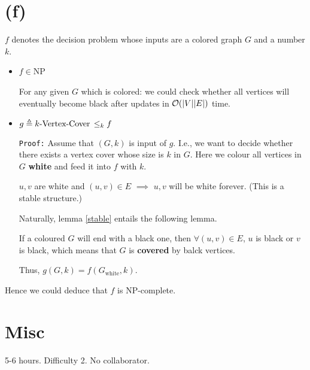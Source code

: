 \documentclass{article}
\begin{document}
\section*{(f)}
$f$ denotes the decision problem whose inputs are a colored graph $G$ and a number $k$.
\begin{itemize}
	\item $f\in$NP

		For any given $G$ which is colored: we could check whether all vertices will eventually become black after updates in  $\mathcal{O}(\qty|V|\qty|E|)$ time.

	\item $g\triangleq k\text{-Vertex-Cover}\,\le_k f$

		\texttt{Proof:} 
		Assume that $(G,k)$ is input of  $g$. I.e., we want to decide whether there exists a vertex cover whose size is  $k$ in $G$.
		Here we colour all vertices in $G$ \textbf{white} and feed it into $f$ with $k$.
		\begin{lemma}
			$u,v$ are white and  $(u,v)\in E$ $\implies$ $u,v$ will be white forever. (This is a stable structure.)
			\label{stable}
		\end{lemma}
		Naturally, lemma \ref{stable} entails the following lemma.
		\begin{lemma}
			If a coloured $G$ will end with a black one, then  $\forall (u,v)\in E$, $u$ is black or  $v$ is black, which means that $G$ is \textbf{covered} by balck vertices.
			\label{black}
		\end{lemma}
		
		Thus, $g(G,k)=f(G_{\mathrm{white}},k)$.
\end{itemize}

Hence we could deduce that $f$ is NP-complete.

\section*{Misc}
5-6 hours. Difficulty 2. No collaborator.
\end{document}
